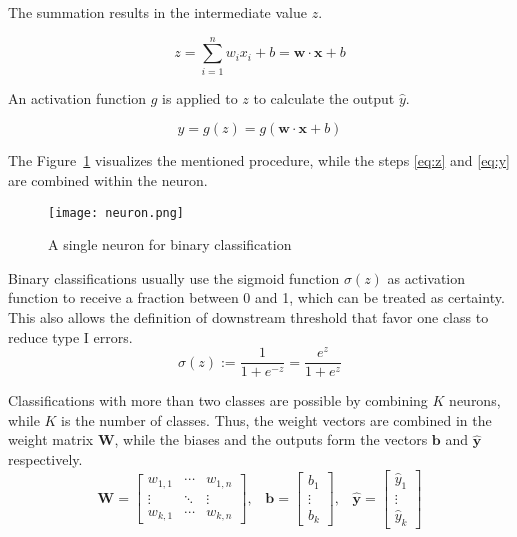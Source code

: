 The summation results in the intermediate value $z$.

\begin{equation} \label{eq:z}
    z = \sum_{i=1}^n w_i x_i + b = \mathbf{w} \cdot \mathbf{x} + b
\end{equation}

An activation function $g$ is applied to $z$ to calculate the output $\hat{y}$.

\begin{equation} \label{eq:y}
\hat{y} = g(z) = g(\mathbf{w} \cdot \mathbf{x} + b)
\end{equation}

The Figure~\ref{fig:neuron} visualizes the mentioned procedure, while the steps \ref{eq:z} and \ref{eq:y} are combined within the neuron.

\begin{figure}[H]
    \begin{center}
    \texttt{[image: neuron.png]}
    \caption{A single neuron for binary classification}\label{fig:neuron}
    \end{center}
\end{figure}

Binary classifications usually use the sigmoid function $\sigma(z)$ as activation function to receive a fraction between 0 and 1, which can be treated as certainty. This also allows the definition of downstream threshold that favor one class to reduce type I errors.
\begin{equation}
    \sigma(z) := \frac{1}{1+e^{-z}} = \frac{e^{z}}{1+e^{z}}
\end{equation}

Classifications with more than two classes are possible by combining $K$ neurons, while $K$ is the number of classes. Thus, the weight vectors are combined in the weight matrix $\mathbf{W}$, while the biases and the outputs form the vectors $\mathbf{b}$ and $\mathbf{\hat{y}}$ respectively.
\begin{equation}
    \mathbf{W} = \begin{bmatrix}w_{1,1}&\cdots &w_{1,n}\\\vdots &\ddots &\vdots\\w_{k,1}&\cdots &w_{k,n}\end{bmatrix}\text{,}\quad\mathbf{b} = \begin{bmatrix}b_1\\\vdots \\b_k\end{bmatrix}\text{,}\quad\mathbf{\hat{y}} = \begin{bmatrix}\hat{y}_1\\\vdots \\\hat{y}_k\end{bmatrix}
\end{equation}

